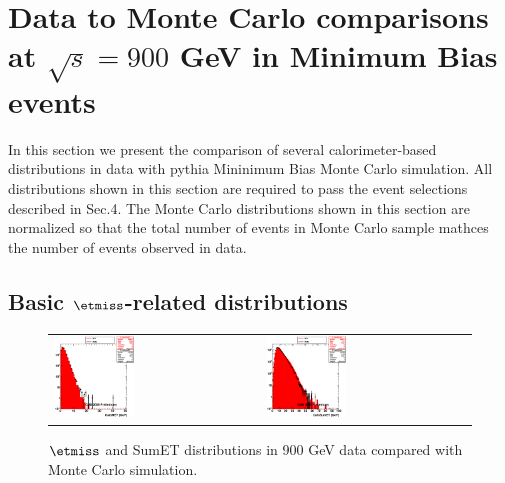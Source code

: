 \section{Data to Monte Carlo comparisons at $\sqrt{s}=900$ GeV in
  Minimum Bias events}
\label{sc:DataVsMCMB900}

In this section we present the comparison of several calorimeter-based
distributions in data with {\sc pythia} Mininimum Bias Monte Carlo simulation. All distributions
shown in this section are required to pass the event selections
described in Sec.4. The Monte Carlo distributions shown in this section
are normalized so that the total number of events in Monte Carlo sample
mathces the number of events observed in data.


\subsection{Basic $\etmiss$-related distributions}
\begin{figure}[h!]
 \centering
 \begin{tabular}{ll}
  \includegraphics[width=0.40\textwidth]{plots_DataVsMC_MB_900GeV/h_calometPt.eps} &
  \includegraphics[width=0.40\textwidth]{plots_DataVsMC_MB_900GeV/h_caloSumet.eps} \\
 \end{tabular}
 \caption{$\etmiss$ and SumET distributions in 900 GeV data compared
   with Monte Carlo simulation.
          \label{fig:DataVsMC_MB_900_1}}
\end{figure}

